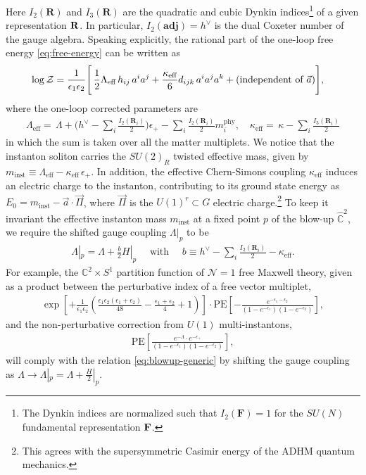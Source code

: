 \documentclass[letterpaper, 11pt]{article}
\def\IC{\mathbb{C}}
\def\CZ{{\cal Z}}
\def\e{\epsilon}
\def\k{\kappa}
\begin{document}
Here $I_2(\mathbf{R})$ and $I_3(\mathbf{R})$ are the quadratic and cubic Dynkin indices\footnote{The Dynkin indices are normalized such that $I_2(\mathbf{F}) = 1$ for the $SU(N)$ fundamental representation $\bf F$.} of a given representation $\bf R$. In particular, $I_2(\mathbf{adj}) = h^\vee$ is the dual Coxeter number of the gauge algebra.
Speaking explicitly, the rational part of the one-loop free energy  \eqref{eq:free-energy} can be written as 
\begin{align}
  \log{\CZ}=\frac{1}{\e_1\e_2}\Bigg[&\,\frac{1}{2}\Lambda_\text{eff}\,h_{ij}\,a^ia^j+\frac{\k_\text{eff}}{6}d_{ijk}\,a^ia^ja^k+ \text{(independent of $\vec{a}$)}\Bigg],
  \end{align}
where the one-loop corrected parameters are 
\begin{align}
  \Lambda_{\textrm{eff}}=\,\Lambda+\Bigg(h^{\vee}-\sum_i\frac{I_2(\boldsymbol{R}_i)}{2}\Bigg)\e_+-\sum_i\frac{I_2(\boldsymbol{R}_i)}{2}m_i^{\textrm{phy}},\quad 
  \k_{\textrm{eff}}=\,\k-\sum_i\frac{I_3(\boldsymbol{R}_i)}{2}
\end{align}
in which the sum is taken over all the matter multiplets. We notice that the instanton soliton carries the $SU(2)_R$ twisted effective mass, given by $m_\text{inst} \equiv \Lambda_{\textrm{eff}} - \kappa_\text{eff}\,\e_+$.
In addition, the  effective Chern-Simons coupling $\k_{\textrm{eff}}$ induces an electric charge to the instanton, contributing to its ground state energy as $E_0 = m_\text{inst} - \vec{a} \cdot \vec{\Pi}$, where $\vec{\Pi}$ is the $U(1)^r \subset G$ electric charge.\footnote{This agrees with the supersymmetric Casimir energy of the ADHM quantum mechanics.} To keep it invariant the effective instanton mass $m_\text{inst}$ at a fixed point $p$ of the blow-up $\hat{\IC}^2$, we require the shifted gauge coupling $\Lambda|_p$  to be 
\begin{align}
  \label{eq:coupling-shift}
  \Lambda|_p = \Lambda + \frac{b}{2}H|_p \quad \text{ with }\quad
  b \equiv h^{\vee}-\sum_i\frac{I_2(\boldsymbol{R}_i)}{2} - \kappa_\text{eff}.
\end{align}
For example, the $\IC^2 \times S^1$ partition function of $\mathcal{N}=1$ free Maxwell theory, given as a product between the perturbative index of a free vector multiplet,
\begin{align}
    \exp\left[+\frac{1}{\e_1 \e_2} \left(\frac{\epsilon _1
  \epsilon _2 (\epsilon _1+\epsilon _2)}{48} -\frac{\epsilon _1+\epsilon _2}{4} +1 \right)  \right] \cdot  \text{PE}\left[-\frac{e^{-\e_1-\e_2}}{(1-e^{-\e_1})(1-e^{-\e_2})}\right],
\end{align}
and the non-perturbative correction from $U(1)$ multi-instantons,
\begin{align}
  \text{PE}\left[\frac{e^{-\Lambda} \cdot e^{-\e_+}}{(1-e^{-\e_1})(1-e^{-\e_2})}\right],
\end{align}
will comply with the relation \eqref{eq:blowup-generic} by shifting the gauge coupling as $\Lambda \rightarrow \Lambda|_p = \Lambda + \frac{H}{2}|_p$. 
\end{document}
